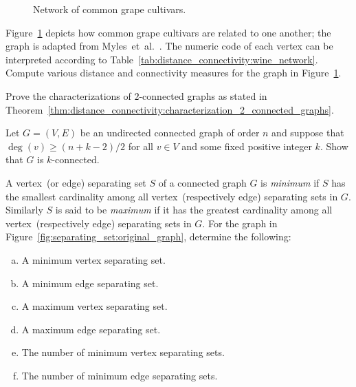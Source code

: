 \begin{problem}
\begin{figure}[!htbp]
\centering
{}

\caption{Network of common grape cultivars.}
\label{fig:distance_connectivity:wine_network}
\end{figure}

\item Figure~\ref{fig:distance_connectivity:wine_network} depicts how
  common grape cultivars are related to one another; the
  graph is adapted from Myles~et~al.~\cite{MylesEtAl2010}. The numeric
  code of each vertex can be interpreted according to
  Table~\ref{tab:distance_connectivity:wine_network}. Compute various
  distance and connectivity measures for the graph in
  Figure~\ref{fig:distance_connectivity:wine_network}.

\item Prove the characterizations of $2$-connected graphs as stated in
  Theorem~\ref{thm:distance_connectivity:characterization_2_connected_graphs}.

\item Let $G = (V,E)$ be an undirected connected graph of order $n$
  and suppose that $\deg(v) \geq (n + k - 2) / 2$ for all $v \in V$
  and some fixed positive integer $k$. Show that $G$ is
  $k$-connected.

\item A vertex~(or edge) separating set $S$ of a connected graph $G$
  is \emph{minimum} if $S$ has the smallest cardinality among all
  vertex~(respectively edge) separating sets in $G$. Similarly $S$ is
  said to be \emph{maximum} if it has the greatest cardinality among
  all vertex~(respectively edge) separating sets in $G$. For the graph
  in Figure~\ref{fig:separating_set:original_graph}, determine the
  following:
  \begin{enumerate}[(a)]
  \item A minimum vertex separating set.

  \item A minimum edge separating set.

  \item A maximum vertex separating set.

  \item A maximum edge separating set.

  \item The number of minimum vertex separating sets.

  \item The number of minimum edge separating sets.
  \end{enumerate}
\end{problem}
